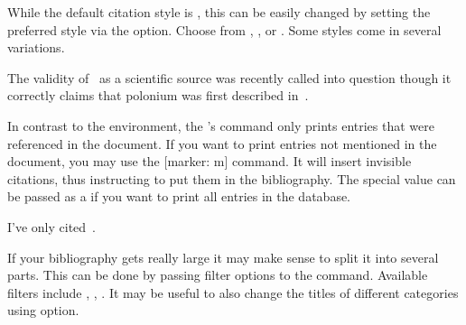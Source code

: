 While the default citation style is , this can be easily changed by
setting the preferred style via the  option. Choose from
,
,  or . Some styles come in
several variations.
\begin{example}[standalone,
  biber,
  paperwidth=6.5cm,
  paperheight=7.2cm,
]
\usepackage[
  style=alphabetic
]{biblatex}



\sloppy


\setlength{\parindent}{0pt} %
The validity of~\cite{dream}
as a scientific source was
recently called into question
though it correctly claims
that polonium was first
described in~\cite{curie}.
\printbibliography

\end{example}

In contrast to the  environment, the 's
 command only prints entries that were referenced in the
document. If you want to print entries not mentioned in the document, you may
use the [marker: m] command. It will insert invisible citations, thus
instructing  to put them in the bibliography. The special value
\cargv{*} can be passed as a  if you want to print all entries in
the database.
\begin{example}[standalone,
  biber,
  paperwidth=7cm,
  paperheight=7cm,
]
\usepackage{biblatex}


\setlength{\parindent}{0pt}
I've only
cited~\cite{lshort}.

\nocite{*}
\printbibliography

\end{example}

If your bibliography gets really large it may make sense to split it into
several parts. This can be done by passing filter options to the
 command. Available filters include ,
, . It may be useful to also change the titles of
different categories using  option.

\begin{example}[standalone,
  biber,
  paperwidth=6.5cm,
  paperheight=6.5cm,
]
\usepackage{biblatex}


\setlength{\parindent}{0pt}
\nocite{*}
\printbibliography[
  type=book,
  title=Books I've referenced
]

\printbibliography[
  keyword=unreliable,
  title=Don't trust those
]

\end{example}

